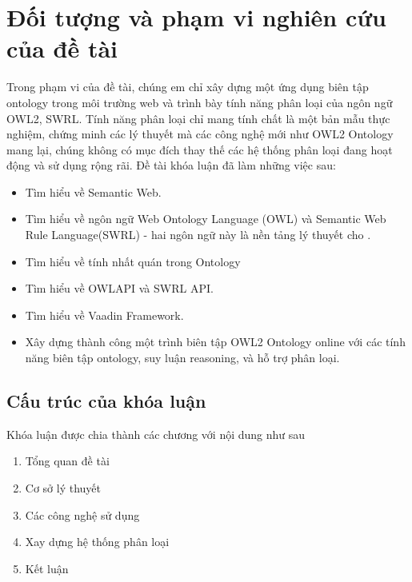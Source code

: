 \section{Đối tượng và phạm vi nghiên cứu của đề tài}
Trong phạm vi của đề tài, chúng em chỉ xây dựng một ứng dụng biên tập ontology trong môi trường web và trình bày tính năng phân loại của ngôn ngữ OWL2, SWRL. Tính năng phân loại chỉ mang tính chất là một bản mẫu thực nghiệm, chứng minh các lý thuyết mà các công nghệ mới như OWL2 Ontology mang lại, chúng không có mục đích thay thế các hệ thống phân loại đang hoạt động và sử dụng rộng rãi.
Đề tài khóa luận đã làm những việc sau:
\begin{itemize}
\item Tìm hiểu về Semantic Web.
\item Tìm hiểu về ngôn ngữ Web Ontology Language (OWL) và Semantic Web Rule Language(SWRL) - hai ngôn ngữ này là nền tảng lý thuyết cho .
\item Tìm hiểu về tính nhất quán trong Ontology
\item Tìm hiểu về OWLAPI và SWRL API.
\item Tìm hiểu về Vaadin Framework.
\item Xây dựng thành công một trình biên tập OWL2 Ontology online với các tính năng biên tập ontology, suy luận reasoning, và hỗ trợ phân loại.
\end{itemize}

\subsection{Cấu trúc của khóa luận}
Khóa luận được chia thành các chương với nội dung như sau
\begin{enumerate}
\item Tổng quan đề tài
\item Cơ sở lý thuyết
\item Các công nghệ sử dụng
\item Xay dựng hệ thống phân loại
\item Kết luận 
\end{enumerate}
